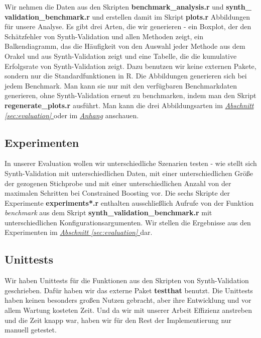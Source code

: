 \documentclass[12pt,a4paper,twoside]{scrartcl}
\numberwithin{equation}{section}
\newcommand{\refsec}[1]{\emph{\hyperref[#1]{Abschnitt \ref*{#1} }}}
\begin{document}
Wir nehmen die Daten aus den Skripten \textbf{benchmark\_analysis.r} und \textbf{synth\_\\validation\_benchmark.r} und erstellen damit im Skript \textbf{plots.r} Abbildungen für unsere Analyse. Es gibt drei Arten, die wir generieren - ein Boxplot, der den Schätzfehler von Synth-Validation und allen Methoden zeigt, ein Balkendiagramm, das die Häufigkeit von den Auswahl jeder Methode aus dem Orakel und aus Synth-Validation zeigt und eine Tabelle, die die kumulative Erfolgsrate von Synth-Validation zeigt. Dazu benutzen wir keine externen Pakete, sondern nur die Standardfunktionen in R. Die Abbildungen generieren sich bei jedem Benchmark. Man kann sie nur mit den verfügbaren Benchmarkdaten generieren, ohne Synth-Validation erneut zu benchmarken, indem man den Skript \textbf{regenerate\_plots.r} ausführt. Man kann die drei Abbildungsarten im \refsec{sec:evaluation} oder im \emph{\hyperref[anhang]{Anhang}} anschauen.


\subsection{Experimenten}\label{subsec:experimenten}
In unserer Evaluation wollen wir unterschiedliche Szenarien testen - wie stellt sich Synth-Validation mit unterschiedlichen Daten, mit einer unterschiedlichen Größe der gezogenen Stichprobe und mit einer unterschiedlichen Anzahl von der maximalen Schritten bei Constrained Boosting vor. Die sechs Skripte der Experimente \textbf{experiments*.r} enthalten ausschließlich Aufrufe von der Funktion \emph{benchmark} aus dem Skript \textbf{synth\_validation\_benchmark.r} mit unterschiedlichen Konfigurationsargumenten. Wir stellen die Ergebnisse aus den Experimenten im \refsec{sec:evaluation} dar.\par

\subsection{Unittests}\label{subsec:unitTests}
Wir haben Unittests für die Funktionen aus den Skripten von Synth-Validation geschrieben. Dafür haben wir das externe Paket \textbf{testthat} benutzt. Die Unittests haben keinen besonders großen Nutzen gebracht, aber ihre Entwicklung und vor allem Wartung kosteten Zeit. Und da wir mit unserer Arbeit Effizienz anstreben und die Zeit knapp war, haben wir für den Rest der Implementierung nur manuell getestet.\par 
      	  	
\end{document}
